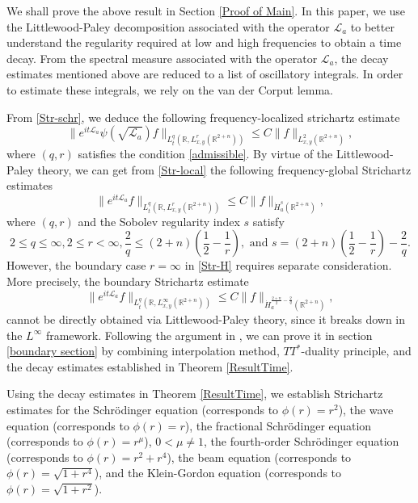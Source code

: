 \documentclass[a4paper,11pt, reqno]{amsart}
\numberwithin{equation}{section}
\theoremstyle{plain}
\theoremstyle{definition}
\theoremstyle{remark}
\begin{document}
 We shall prove the above result in Section \ref{Proof of Main}.  In this paper, we use the Littlewood-Paley decomposition associated with the operator $\mathcal{L}_a$ to better understand the regularity required at low and high frequencies to obtain a time decay. From the spectral measure associated with the operator $\mathcal{L}_a$, the decay estimates mentioned above are reduced to a list of oscillatory integrals. In order to estimate these integrals, we rely on the van der Corput lemma. 

From \eqref{Str-schr}, we deduce the following frequency-localized strichartz estimate
\begin{equation}\label{Str-local}
\|e^{it\mathcal{L}_a}\psi(\sqrt{\mathcal{L}_a})f\|_{L_t^q(\mathbb{R},L_{x,y}^r(\mathbb{R}^{2+n}))}\leq C\|f\|_{L_{x,y}^2(\mathbb{R}^{2+n})},
\end{equation}
where $(q,r)$ satisfies the condition \eqref{admissible}. By virtue of the Littlewood-Paley theory, we can get from \eqref{Str-local} the following frequency-global Strichartz estimates 
\begin{equation}\label{Str-H}
\|e^{it\mathcal{L}_a}f\|_{L_t^q(\mathbb{R},L_{x,y}^r(\mathbb{R}^{2+n}))}\leq C\|f\|_{\dot{H}_a^s(\mathbb{R}^{2+n})},
\end{equation}
where $(q,r)$ and the Sobolev regularity index $s$ satisfy
\begin{equation*}
2\leq q\leq \infty, 2\leq r<\infty, \frac{2}{q}\leq (2+n)\left(\frac{1}{2}-\frac{1}{r}\right), \text{ and } s=(2+n)\left(\frac{1}{2}-\frac{1}{r}\right)-\frac{2}{q}.
\end{equation*}
However, the boundary case $r=\infty$ in \eqref{Str-H} requires separate consideration. More precisely, the boundary Strichartz estimate 
\begin{equation*}
\|e^{it\mathcal{L}_a}f\|_{L_t^q(\mathbb{R},L_{x,y}^\infty(\mathbb{R}^{2+n}))}\leq C\|f\|_{\dot{H}_a^{\frac{2+n}{2}-\frac{2}{q}}(\mathbb{R}^{2+n})},
\end{equation*}
cannot be directly obtained via Littlewood-Paley theory, since it breaks down in the $L^\infty$ framework. Following the argument in \cite{GLNY}, we can prove it in section \ref{boundary section} by combining interpolation method, $TT^*$-duality principle, and the decay estimates established in Theorem \ref{ResultTime}.


 
 Using the decay estimates in Theorem \ref{ResultTime},  
 we establish Strichartz estimates for the Schr\"{o}dinger equation (corresponds to $\phi(r)=r^2$), the wave equation (corresponds to $\phi(r)=r$), the fractional Schr\"{o}dinger equation (corresponds to $\phi(r)=r^\mu$), $0<\mu\neq 1$, the fourth-order Schr\"{o}dinger equation (corresponds to $\phi(r)=r^2+r^4$), the beam equation  (corresponds to $\phi(r)=\sqrt{1+r^4}$), and the Klein-Gordon equation (corresponds to $\phi(r)=\sqrt{1+r^2}$). 
\end{document}
